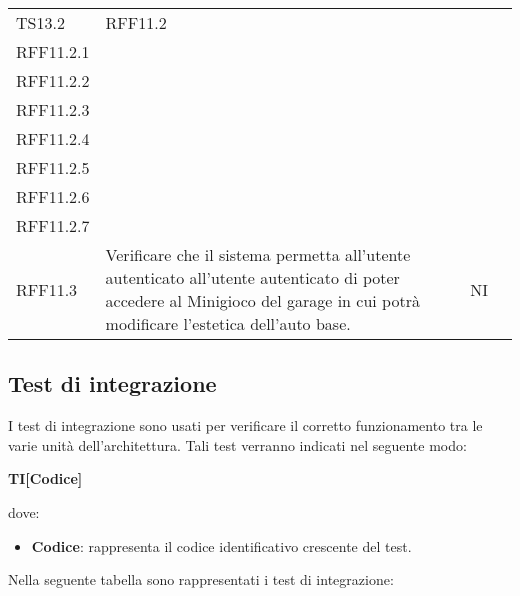 \begin{longtable}{ >{\centering}p{} >{\centering}p{} >{\centering}p{}
			>{\centering}p{}}
		TS13.2	& RFF11.2\\ RFF11.2.1 \\ RFF11.2.2 \\ RFF11.2.3 \\ RFF11.2.4 \\ RFF11.2.5  \\ RFF11.2.6 \\ RFF11.2.7 \\RFF11.3 & Verificare che il sistema permetta all'utente autenticato all'utente autenticato di poter accedere al Minigioco del garage in cui potrà modificare l'estetica dell'auto base. 	&	NI	\tabularnewline
\end{longtable}
\newpage
\subsection{Test di integrazione}
I test di integrazione sono usati per verificare il corretto funzionamento tra le varie unità dell'architettura. Tali test verranno indicati nel seguente modo:\\
	\centerline{\textbf{TI[Codice]}}
dove:
\begin{itemize}
	\item \textbf{Codice}: rappresenta il codice identificativo crescente del test.
\end{itemize}
Nella seguente tabella sono rappresentati i test di integrazione:
\renewcommand{\arraystretch}{1.5}

